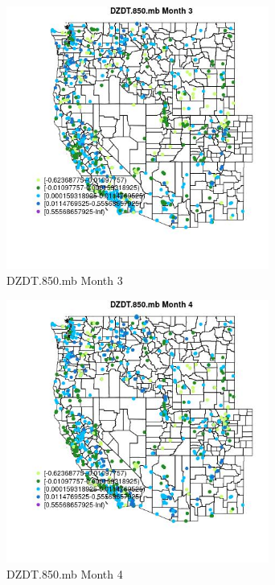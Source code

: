 \begin{figure} 
\centering  
\includegraphics[width=0.77\textwidth]{Code_Outputs/Report_ML_input_PM25_Step4_part_f_de_duplicated_aveswNAs_MapObsMo3DZDT850mb.jpg} 
\caption{\label{fig:Report_ML_input_PM25_Step4_part_f_de_duplicated_aveswNAsMapObsMo3DZDT850mb}DZDT.850.mb Month 3} 
\end{figure} 
 

\begin{figure} 
\centering  
\includegraphics[width=0.77\textwidth]{Code_Outputs/Report_ML_input_PM25_Step4_part_f_de_duplicated_aveswNAs_MapObsMo4DZDT850mb.jpg} 
\caption{\label{fig:Report_ML_input_PM25_Step4_part_f_de_duplicated_aveswNAsMapObsMo4DZDT850mb}DZDT.850.mb Month 4} 
\end{figure} 
 

